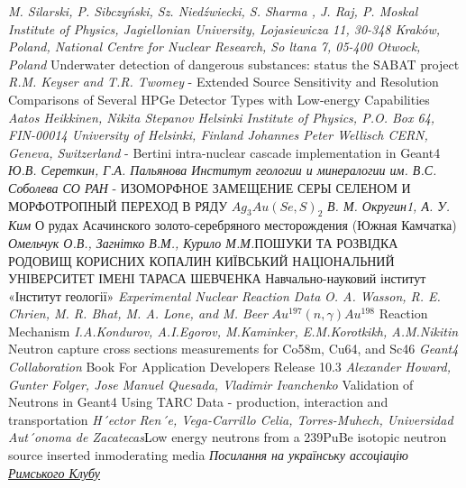 \documentclass[a4paper, 14pt]{article}
\numberwithin{equation}{section}
\numberwithin{table}{section}
\begin{document}
\pagebreak
\newpage	
\begin{thebibliography}{}
	
	\textit{M. Silarski, P. Sibczyński, Sz. Niedźwiecki, S. Sharma , J. Raj, P. Moskal Institute of Physics, Jagiellonian University, Lojasiewicza 11, 30-348 Kraków, Poland, National Centre for Nuclear Research, So ltana 7, 05-400 Otwock, Poland } Underwater detection of dangerous substances: status the
	SABAT project \label{lit:sabat}
	 \textit{R.M. Keyser and T.R. Twomey} - Extended Source Sensitivity and Resolution Comparisons of Several HPGe Detector Types with Low-energy Capabilities 
	 \textit{Aatos Heikkinen, Nikita Stepanov Helsinki Institute of Physics, P.O. Box 64, FIN-00014 University of Helsinki, Finland Johannes Peter Wellisch CERN, Geneva, Switzerland} - Bertini intra-nuclear cascade implementation in Geant4 
	 \textit{Ю.В. Сереткин, Г.А. Пальянова Институт геологии и минералогии им. В.С. Соболева СО РАН} - ИЗОМОРФНОЕ ЗАМЕЩЕНИЕ СЕРЫ СЕЛЕНОМ И МОРФОТРОПНЫЙ ПЕРЕХОД В РЯДУ $Ag_3Au(Se,S)_2$ 	
	 \textit{В. М. Округин1, А. У. Ким} О рудах Асачинского золото-серебряного месторождения
	(Южная Камчатка)
	 \textit{Омельчук О.В., Загнітко В.М., Курило М.М.}ПОШУКИ ТА РОЗВІДКА РОДОВИЩ КОРИСНИХ КОПАЛИН КИЇВСЬКИЙ НАЦІОНАЛЬНИЙ УНІВЕРСИТЕТ ІМЕНІ ТАРАСА ШЕВЧЕНКА Навчально-науковий інститут «Інститут геології»
	 \textit{Experimental Nuclear Reaction Data}
	 \textit{O. A. Wasson, R. E. Chrien, M. R. Bhat, M. A. Lone, and M. Beer} $Au^{197}(n, \gamma)Au^{198}$ Reaction Mechanism 
	 \textit{	I.A.Kondurov, A.I.Egorov, M.Kaminker, E.M.Korotkikh, A.M.Nikitin}  Neutron capture cross sections measurements for Co58m, Cu64, and Sc46
	 \textit{ Geant4 Collaboration } Book For Application Developers
	Release 10.3
	 \textit{ Alexander Howard, Gunter Folger, Jose Manuel Quesada, Vladimir Ivanchenko} Validation of Neutrons in Geant4 Using TARC Data - production, interaction and transportation \label{lit:tarc}
	 \textit{H´ector Ren´e, Vega-Carrillo Celia, Torres-Muhech, Universidad Aut´onoma de Zacatecas}Low energy neutrons from a 239PuBe isotopic neutron source inserted inmoderating media
	 \textit{Посилання на українську ассоціацію \href{http://www.clubofrome.org.ua/}{Римського Клубу}} \label{lit:romeClub}
	
\end{thebibliography}
	
\end{document}
